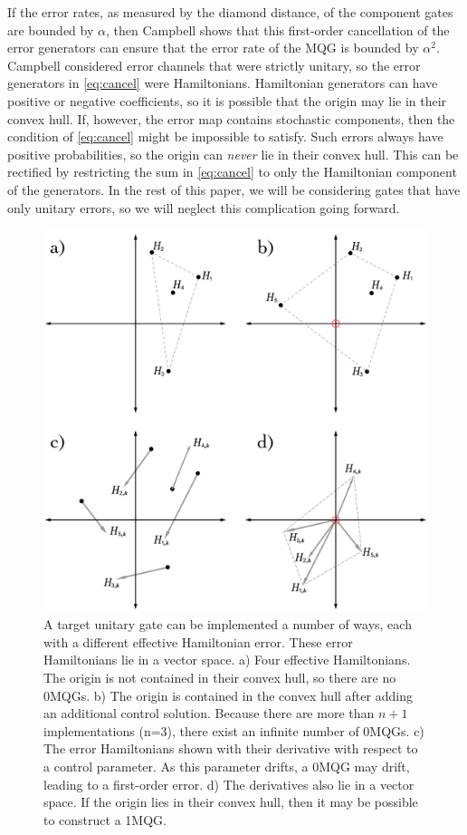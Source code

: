 \documentclass[aps,nofootinbib,pra,notitlepage,twocolumn]{revtex4-1}
\begin{document}
If the error rates, as measured by the diamond distance, of the component gates are bounded by $\alpha$, then Campbell shows that this first-order cancellation of the error generators can ensure that the error rate of the MQG is bounded by $\alpha^2$. Campbell considered error channels that were strictly unitary, so the error generators in \ref{eq:cancel} were Hamiltonians. Hamiltonian generators can have positive or negative coefficients, so it is possible that the origin may lie in their convex hull. If, however, the error map contains stochastic components, then the condition of \ref{eq:cancel} might be impossible to satisfy. Such errors always have positive probabilities, so the origin can \emph{never} lie in their convex hull. This can be rectified by restricting the sum in \ref{eq:cancel} to only the Hamiltonian component of the generators. In the rest of this paper, we will be considering gates that have only unitary errors, so we will neglect this complication going forward. 

\begin{figure}
  \centering
  \includegraphics[width=\columnwidth]{vectorspace.pdf}
  \caption{A target unitary gate can be implemented a number of ways, each with a different effective Hamiltonian error. These error Hamiltonians lie in a vector space. a) Four effective Hamiltonians. The origin is not contained in their convex hull, so there are no 0MQGs. b) The origin is contained in the convex hull after adding an additional control solution. Because there are more than $n+1$ implementations (n=3), there exist an infinite number of 0MQGs. c) The error Hamiltonians shown with their derivative with respect to a control parameter. As this parameter drifts, a 0MQG may drift, leading to a first-order error. d) The derivatives also lie in a vector space. If the origin lies in their convex hull, then it may be possible to construct a 1MQG.}
  \label{fig:vectorspace}
\end{figure}
\end{document}
